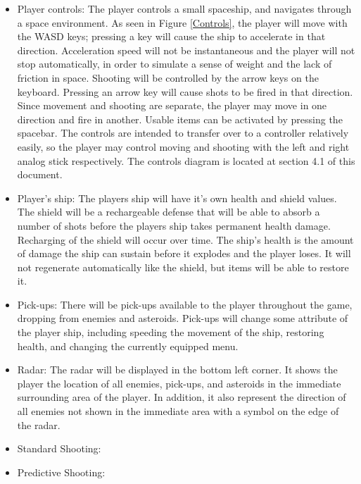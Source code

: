 \documentclass[12pt]{article}       %
\begin{document}
\begin{itemize}
\item Player controls: The player controls a small spaceship, and navigates through a space environment. As seen in Figure \ref{Controls}, the player will move with the WASD keys; pressing a key will cause the ship to accelerate in that direction. Acceleration speed will not be instantaneous and the player will not stop automatically, in order to simulate a sense of weight and the lack of friction in space. Shooting will be controlled by the arrow keys on the keyboard. Pressing an arrow key will cause shots to be fired in that direction. Since movement and shooting are separate, the player may move in one direction and fire in another. Usable items can be activated by pressing the spacebar. The controls are intended to transfer over to a controller relatively easily, so the player may control moving and shooting with the left and right analog stick respectively. The controls diagram is located at section 4.1 of this document.

\item Player’s ship: The players ship will have it’s own health and shield values. The shield will be a rechargeable defense that will be able to absorb a number of shots before the players ship takes permanent health damage. Recharging of the shield will occur over time. The ship’s health is the amount of damage the ship can sustain before it explodes and the player loses. It will not regenerate automatically like the shield, but items will be able to restore it.

\item Pick-ups:  There will be pick-ups available to the player throughout the game, dropping from enemies and asteroids. Pick-ups will change some attribute of the player ship, including  speeding the movement of the ship, restoring health, and changing the currently equipped menu.

\item Radar: The radar will be displayed in the bottom left corner. It shows the player the location of all enemies, pick-ups, and asteroids in the immediate surrounding area of the player. In addition, it also represent the direction of all enemies not shown in the immediate area with a symbol on the edge of the radar.

\item Standard Shooting:

\item Predictive Shooting: 


\end{itemize}
\end{document}
